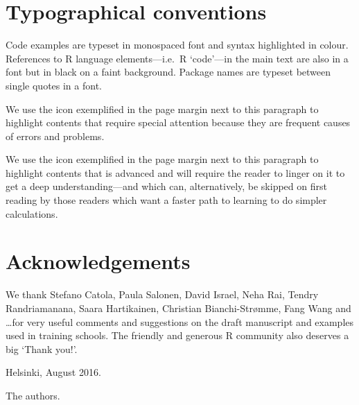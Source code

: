 \section{Typographical conventions}

Code examples are typeset in monospaced font and syntax highlighted in colour. References to R language elements---i.e.\ R `code'---in the main text are also in a  font but in black on a faint background. Package names are typeset between single quotes in a  font.

We\Attention{} use the icon exemplified in the page margin next to this paragraph to highlight contents that require special attention because they are frequent causes of errors and problems.

We\Advanced{} use the icon exemplified in the page margin next to this paragraph to highlight contents that is advanced and will require the reader to linger on it to get a deep understanding---and which can, alternatively, be skipped on first reading by those readers which want a faster path to learning to do simpler calculations.

\section{Acknowledgements}

We thank Stefano Catola, Paula Salonen, David Israel, Neha Rai, Tendry Randriamanana, Saara Hartikainen, Christian Bianchi-Str{\o}mme, Fang Wang and \ldots for very useful comments and suggestions on the draft manuscript and examples used in training schools. The friendly and generous R community also deserves a big `Thank you!'.

Helsinki, August 2016.

The authors. 